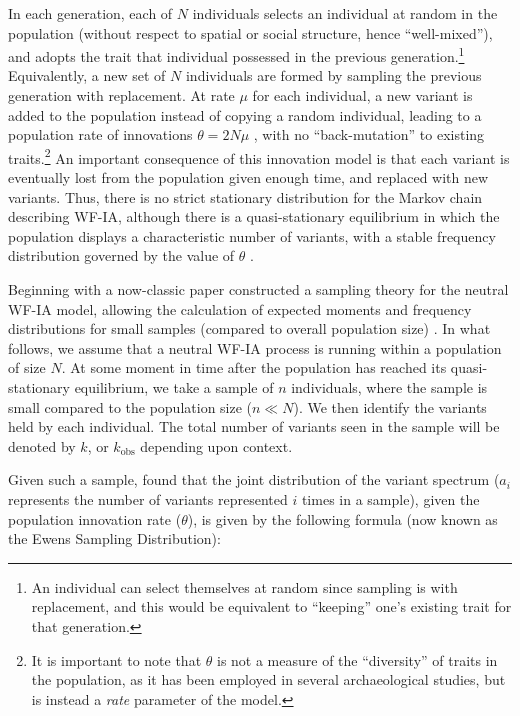 In each generation, each of $N$ individuals selects an individual at random in the population (without respect to spatial or social structure, hence ``well-mixed''), and adopts the trait that individual possessed in the previous generation.\footnote{An individual can select themselves at random since sampling is with replacement, and this would be equivalent to ``keeping'' one's existing trait for that generation.}  Equivalently, a new set of $N$ individuals are formed by sampling the previous generation with replacement.  At rate $\mu$ for each individual, a new variant is added to the population instead of copying a random individual, leading to a population rate of innovations $\theta = 2N\mu$ \citep{Ewens2004}, with no ``back-mutation'' to existing traits.\footnote{It is important to note that $\theta$ is not a measure of the ``diversity'' of traits in the population, as it has been employed in several archaeological studies, but is instead a \emph{rate} parameter of the model.}  An important consequence of this innovation model is that each variant is eventually lost from the population given enough time, and replaced with new variants.  Thus, there is no strict stationary distribution for the Markov chain describing WF-IA, although there is a quasi-stationary equilibrium in which the population displays a characteristic number of variants, with a stable frequency distribution governed by the value of $\theta$ \citep{Ewens2004,watterson1976stationary}.   

Beginning with a now-classic paper \citet{ewens1972sampling} constructed a sampling theory for the neutral WF-IA model, allowing the calculation of expected moments and frequency distributions for small samples (compared to overall population size) \citep[see ][for a complete summary of results on the sampling theory]{Ewens2004}.  In what follows, we assume that a neutral WF-IA process is running within a population of size $N$.  At some moment in time after the population has reached its quasi-stationary equilibrium, we take a sample of $n$ individuals, where the sample is small compared to the population size ($n \ll N$).  We then identify the variants held by each individual.  The total number of variants seen in the sample will be denoted by $k$, or $k_{\text{obs}}$ depending upon context.     

Given such a sample, \citet{ewens1972sampling} found that the joint distribution of the variant spectrum ($a_i$ represents the number of variants represented $i$ times in a sample), given the population innovation rate ($\theta$), is given by the following formula (now known as the Ewens Sampling Distribution):

